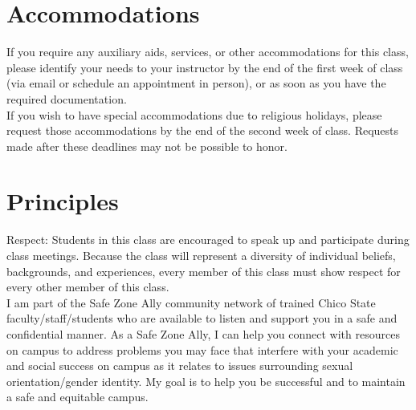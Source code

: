 \documentclass[12pt]{article}
\begin{document}
  \section*{Accommodations}
  \noindent
  If you require any auxiliary aids, services, or other accommodations for this class, please identify your needs to your instructor by the end of the first week of class (via email or schedule an appointment in person), or as soon as you have the required documentation.\\ 
  If you wish to have special accommodations due to religious holidays, please request those accommodations by the end of the second week of class. Requests made after these deadlines may not be possible to honor. 

  \section*{Principles}
  \noindent
  Respect: Students in this class are encouraged to speak up and participate during class meetings. Because the class will represent a diversity of individual beliefs, backgrounds, and experiences, every member of this class must show respect for every other member of this class. \\
  \newline
  I am part of the Safe Zone Ally community network of trained Chico State faculty/staff/students who are available to listen and support you in a safe and confidential manner. As a Safe Zone Ally, I can help you connect with resources on campus to address problems you may face that interfere with your academic and social success on campus as it relates to issues surrounding sexual orientation/gender identity. My goal is to help you be successful and to maintain a safe and equitable campus.
\end{document}
